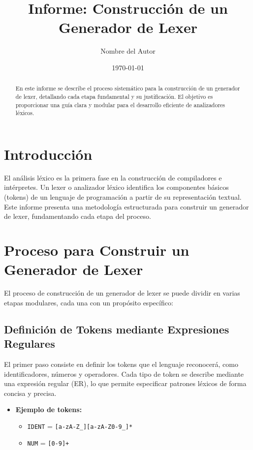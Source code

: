 \documentclass[a4paper,12pt]{article}
\title{Informe: Construcción de un Generador de Lexer}
\author{Nombre del Autor}
\date{\today}
\begin{document}
\maketitle

\begin{abstract}
En este informe se describe el proceso sistemático para la construcción de un generador de lexer, detallando cada etapa fundamental y su justificación. El objetivo es proporcionar una guía clara y modular para el desarrollo eficiente de analizadores léxicos.
\end{abstract}

\section{Introducción}
El análisis léxico es la primera fase en la construcción de compiladores e intérpretes. Un lexer o analizador léxico identifica los componentes básicos (tokens) de un lenguaje de programación a partir de su representación textual. Este informe presenta una metodología estructurada para construir un generador de lexer, fundamentando cada etapa del proceso.

\section{Proceso para Construir un Generador de Lexer}
El proceso de construcción de un generador de lexer se puede dividir en varias etapas modulares, cada una con un propósito específico:

\subsection{Definición de Tokens mediante Expresiones Regulares}
El primer paso consiste en definir los tokens que el lenguaje reconocerá, como identificadores, números y operadores. Cada tipo de token se describe mediante una expresión regular (ER), lo que permite especificar patrones léxicos de forma concisa y precisa.

\begin{itemize}
    \item \textbf{Ejemplo de tokens:}
    \begin{itemize}
        \item \texttt{IDENT} = \verb|[a-zA-Z_][a-zA-Z0-9_]*|
        \item \texttt{NUM} = \verb|[0-9]+|
    \end{itemize}
\end{itemize}
\end{document}
